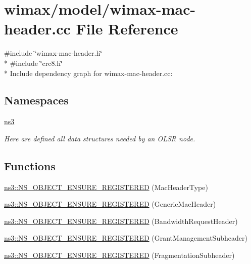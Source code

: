 \hypertarget{wimax-mac-header_8cc}{}\section{wimax/model/wimax-\/mac-\/header.cc File Reference}
\label{wimax-mac-header_8cc}
{\ttfamily \#include \char`\"{}wimax-\/mac-\/header.\+h\char`\"{}}\\*
{\ttfamily \#include \char`\"{}crc8.\+h\char`\"{}}\\*
Include dependency graph for wimax-\/mac-\/header.cc\+:
\subsection*{Namespaces}
\begin{DoxyCompactItemize}
\item 
 \hyperlink{namespacens3}{ns3}
\begin{DoxyCompactList}\small\item\em Here are defined all data structures needed by an O\+L\+SR node. \end{DoxyCompactList}\end{DoxyCompactItemize}
\subsection*{Functions}
\begin{DoxyCompactItemize}
\item 
\hyperlink{namespacens3_a3114be1507cc8254d2f4aa1b9da0b5e5}{ns3\+::\+N\+S\+\_\+\+O\+B\+J\+E\+C\+T\+\_\+\+E\+N\+S\+U\+R\+E\+\_\+\+R\+E\+G\+I\+S\+T\+E\+R\+ED} (Mac\+Header\+Type)
\item 
\hyperlink{namespacens3_a37d689ac43c2d7898827d50c75660295}{ns3\+::\+N\+S\+\_\+\+O\+B\+J\+E\+C\+T\+\_\+\+E\+N\+S\+U\+R\+E\+\_\+\+R\+E\+G\+I\+S\+T\+E\+R\+ED} (Generic\+Mac\+Header)
\item 
\hyperlink{namespacens3_a703fa781406cf798a55d46dcf7ffd97a}{ns3\+::\+N\+S\+\_\+\+O\+B\+J\+E\+C\+T\+\_\+\+E\+N\+S\+U\+R\+E\+\_\+\+R\+E\+G\+I\+S\+T\+E\+R\+ED} (Bandwidth\+Request\+Header)
\item 
\hyperlink{namespacens3_ad58dc6db24c4d0d9763b20b4aeba6c58}{ns3\+::\+N\+S\+\_\+\+O\+B\+J\+E\+C\+T\+\_\+\+E\+N\+S\+U\+R\+E\+\_\+\+R\+E\+G\+I\+S\+T\+E\+R\+ED} (Grant\+Management\+Subheader)
\item 
\hyperlink{namespacens3_accae72e22d4dad74a0516e91349f699d}{ns3\+::\+N\+S\+\_\+\+O\+B\+J\+E\+C\+T\+\_\+\+E\+N\+S\+U\+R\+E\+\_\+\+R\+E\+G\+I\+S\+T\+E\+R\+ED} (Fragmentation\+Subheader)
\end{DoxyCompactItemize}
